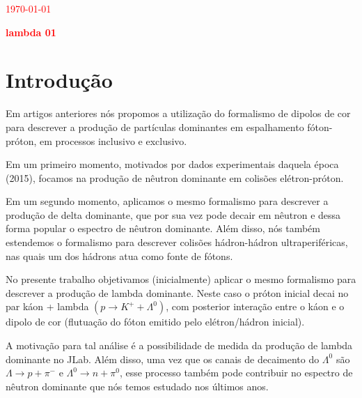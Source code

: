 \documentclass[a4paper,12pt]{article} %
\begin{document}
\begin{center}
\begin{flushleft}
 \textcolor{red}{\today}
\end{flushleft}
\vspace{-0.95cm}
\begin{flushright}
  \textcolor{red}{\textbf{lambda 01}}
\end{flushright}
\vspace{0.2cm}

\end{center}

\section{Introdução}
\indent Em artigos anteriores nós propomos a utilização do formalismo de dipolos de cor 
para descrever a produção de partículas dominantes em espalhamento fóton-próton, 
em processos inclusivo e exclusivo.

Em um primeiro momento, motivados por dados experimentais daquela época (2015), 
focamos na produção de nêutron dominante em colisões elétron-próton.

Em um segundo momento, aplicamos o mesmo formalismo para descrever a produção de delta dominante, 
que por sua vez pode decair em nêutron e dessa forma popular o espectro de nêutron dominante. 
Além disso, nós também estendemos o formalismo para descrever colisões hádron-hádron ultraperiféricas, 
nas quais um dos hádrons atua como fonte de fótons.

No presente trabalho objetivamos (inicialmente) aplicar o mesmo formalismo para descrever a produção 
de lambda dominante. Neste caso o próton inicial decai no par káon + lambda 
$(p \rightarrow K^{+}+\Lambda^{0})$, com posterior interação entre o káon e o dipolo de cor 
(flutuação do fóton emitido pelo elétron/hádron inicial).

A motivação para tal análise é a possibilidade de medida da produção de lambda dominante no JLab. 
Além disso, uma vez que os canais de decaimento do $\Lambda^{0}$ são $\Lambda \rightarrow p + \pi^{-}$
e $\Lambda^{0} \rightarrow n + \pi^{0}$, esse processo também pode contribuir no espectro de nêutron 
dominante que nós temos estudado nos últimos anos.
\end{document}
